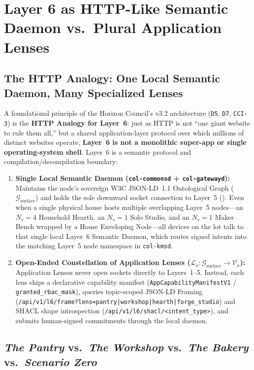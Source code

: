 \section{Layer 6 as HTTP-Like Semantic Daemon vs.\ Plural Application Lenses}
\label{sec:l6-http-lenses}

\subsection{The HTTP Analogy: One Local Semantic Daemon, Many Specialized Lenses}

A foundational principle of the Horizon Council's v3.2 architecture (\texttt{D5}, \texttt{D7}, \texttt{CCI-3}) is the \textbf{HTTP Analogy for Layer~6}: just as HTTP is not ``one giant website to rule them all,'' but a shared application-layer protocol over which millions of distinct websites operate, \textbf{Layer~6 is not a monolithic super-app or single operating-system shell}. Layer~6 is a semantic protocol and compilation/decompilation boundary:
\begin{enumerate}
  \item \textbf{Single Local Semantic Daemon (\texttt{col-commonsd} + \texttt{col-gatewayd}):} Maintains the node's sovereign W3C JSON-LD~1.1 Ontological Graph ($\mathcal{G}_{\mathrm{surface}}$) and holds the sole downward socket connection to Layer~5 (). Even when a single physical house hosts multiple overlapping Layer~5 nodes---an $N_s=4$ Household Hearth, an $N_s=1$ Solo Studio, and an $N_s=1$ Maker Bench wrapped by a House Enveloping Node---all devices on the lot talk to that single local Layer~6 Semantic Daemon, which routes signed intents into the matching Layer~5 node namespace in \texttt{col-kmsd}.
  \item \textbf{Open-Ended Constellation of Application Lenses ($\mathcal{L}_a : \mathcal{G}_{\mathrm{surface}} \to \mathcal{V}_a$):} Application Lenses never open sockets directly to Layers~1--5. Instead, each lens ships a declarative capability manifest (\texttt{AppCapabilityManifestV1} / \texttt{granted\_rbac\_mask}), queries topic-scoped JSON-LD Framing (\texttt{/api/v1/l6/frame?lens=pantry|workshop|hearth|forge\_studio}) and SHACL shape introspection (\texttt{/api/v1/l6/shacl/<intent\_type>}), and submits human-signed commitments through the local daemon.
\end{enumerate}

\subsection{\textit{The Pantry} vs.\ \textit{The Workshop} vs.\ \textit{The Bakery} vs.\ \textit{Scenario Zero}}

